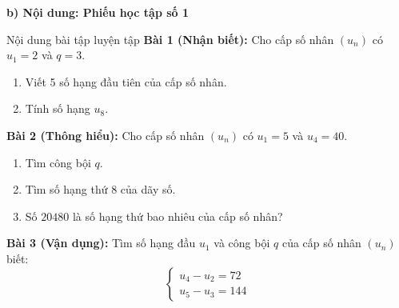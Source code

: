 \documentclass[12pt, a4paper]{article}
\begin{document}
\noindent \textbf{b) Nội dung: Phiếu học tập số 1}
\begin{pedabox}{Nội dung bài tập luyện tập}
\textbf{Bài 1 (Nhận biết):} Cho cấp số nhân $(u_n)$ có $u_1 = 2$ và $q = 3$.
\begin{enumerate}[leftmargin=0.6cm]
    \item Viết 5 số hạng đầu tiên của cấp số nhân.
    \item Tính số hạng $u_8$.
\end{enumerate}
\textbf{Bài 2 (Thông hiểu):} Cho cấp số nhân $(u_n)$ có $u_1 = 5$ và $u_4 = 40$.
\begin{enumerate}[leftmargin=0.6cm]
    \item Tìm công bội $q$.
    \item Tìm số hạng thứ 8 của dãy số.
    \item Số $20480$ là số hạng thứ bao nhiêu của cấp số nhân?
\end{enumerate}
\textbf{Bài 3 (Vận dụng):} Tìm số hạng đầu $u_1$ và công bội $q$ của cấp số nhân $(u_n)$ biết:
$$\begin{cases} u_4 - u_2 = 72 \\ u_5 - u_3 = 144 \end{cases}$$
\end{pedabox}
\end{document}
